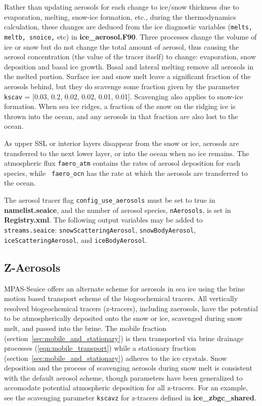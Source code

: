 Rather than updating aerosols for each change to ice/snow thickness
due to evaporation, melting,  snow-ice formation, etc., during the
thermodynamics calculation, these  changes are deduced from the
ice diagnostic variables  ({\tt melts, meltb, snoice,} etc) in {\bf
  ice\_aerosol.F90}.   Three processes change the volume of ice or
snow but do not change the  total amount of aerosol, thus causing the
aerosol concentration  (the value of the tracer itself) to change:
evaporation, snow deposition  and basal ice growth.  Basal and lateral
melting remove all  aerosols in the melted portion.  Surface ice and
snow melt leave a  significant fraction of the aerosols behind, but
they do scavenge some fraction given by the parameter  {\tt
  kscav} = [0.03, 0.2, 0.02, 0.02, 0.01, 0.01].   Scavenging also applies
to snow-ice formation.   When sea ice ridges, a fraction of the snow
on the ridging ice is  thrown into the ocean, and any aerosols in that
fraction are also  lost to the ocean.

As upper SSL or interior layers disappear from the snow or ice,
aerosols are transferred to the  next lower layer, or into the ocean
when no ice remains.   The atmospheric flux {\tt faero\_atm} contains
the rates of aerosol  deposition for each species, while {\tt
  faero\_ocn} has the rate at  which the aerosols are transferred to the ocean.

The aerosol tracer flag {\tt config\_use\_aerosols} must be set to true in {\bf
  namelist.seaice}, and the number  of aerosol species, {\tt nAerosols}, is set in {\bf
  Registry.xml}.  The following output variables may be added to {\tt
  streams.seaice}: {\tt snowScatteringAerosol}, {\tt snowBodyAerosol},
{\tt iceScatteringAerosol}, and {\tt iceBodyAerosol}.


\subsection{Z-Aerosols}

MPAS-Seaice  offers an alternate scheme for aerosols
in sea ice using the brine motion based transport scheme of the
biogeochemical tracers.   All vertically resolved biogeochemical
tracers (z-tracers), including
zaerosols, have the potential to be atmospherically deposited onto the
snow or ice, scavenged during snow melt, and passed into the brine.
The mobile fraction (section~\ref{sec:mobile_and_stationary}) is then transported via brine drainage processes
(\ref{eqn:mobile_transport})
while a stationary fraction (section~\ref{sec:mobile_and_stationary}) adheres
to the ice crystals.  Snow deposition and the process of
scavenging aerosols during snow melt is consistent with the default
aerosol scheme, though parameters have been generalized to accomodate
potential atmospheric deposition for all z-tracers.  For an example,
see the scavenging parameter {\tt kscavz} for z-tracers defined in {\bf
  ice\_zbgc\_shared}.


